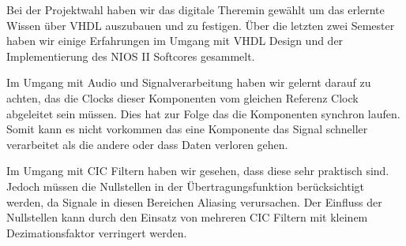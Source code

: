 Bei der Projektwahl haben wir das digitale Theremin gewählt um das erlernte Wissen über VHDL auszubauen und zu festigen. Über die letzten zwei Semester haben wir einige Erfahrungen im Umgang mit VHDL Design und der Implementierung des NIOS II Softcores gesammelt.

Im Umgang mit Audio und Signalverarbeitung haben wir gelernt darauf zu achten, das die Clocks dieser Komponenten vom gleichen Referenz Clock abgeleitet sein müssen. Dies hat zur Folge das die Komponenten synchron laufen. Somit kann es nicht vorkommen das eine Komponente das Signal schneller verarbeitet als die andere oder dass Daten verloren gehen. 

Im Umgang mit CIC Filtern haben wir gesehen, dass diese sehr praktisch sind. Jedoch müssen die Nullstellen in der Übertragungsfunktion berücksichtigt werden, da Signale in diesen Bereichen Aliasing verursachen. Der Einfluss der Nullstellen kann durch den Einsatz von mehreren CIC Filtern mit kleinem Dezimationsfaktor verringert werden.


